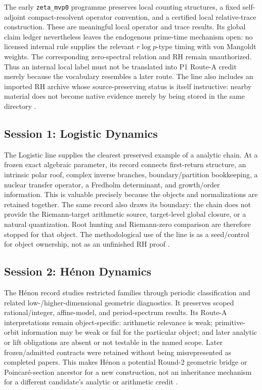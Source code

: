 The early \texttt{zeta\_mvp0} programme preserves local counting structures,
a fixed self-adjoint compact-resolvent operator convention, and a certified
local relative-trace construction. These are meaningful local operator and
trace results. Its global claim ledger nevertheless leaves the endogenous
prime-time mechanism open: no licensed internal rule supplies the relevant
\(r\log p\)-type timing with von Mangoldt weights. The corresponding
zero-spectral relation and RH remain unauthorized. Thus an internal local
label must not be translated into P1 Route-A credit merely because the
vocabulary resembles a later route. The line also includes an imported RH
archive whose source-preserving status is itself instructive: nearby material
does not become native evidence merely by being stored in the same directory
\citep{PhaseIRepository}.



\subsection{Session 1: Logistic Dynamics}

The Logistic line supplies the clearest preserved example of a \sameobject{}
analytic chain. At a frozen exact algebraic parameter, its record connects
first-return structure, an intrinsic polar roof, complex inverse branches,
boundary/partition bookkeeping, a nuclear transfer operator, a Fredholm
determinant, and growth/order information. This is valuable precisely because
the objects and normalizations are retained together. The same record also
draws its boundary: the chain does not provide the Riemann-target arithmetic
source, target-level global closure, or a natural quantization. Root hunting
and Riemann-zero comparison are therefore stopped for that object. The
methodological use of the line is as a seed/control for object ownership, not
as an unfinished RH proof \citep{PhaseIRepository}.

\subsection{Session 2: H\'{e}non Dynamics}

The H\'{e}non record studies restricted families through periodic
classification and related low-/higher-dimensional geometric diagnostics. It
preserves scoped rational/integer, affine-model, and period-spectrum results.
Its Route-A interpretations remain object-specific: arithmetic relevance is
weak; primitive-orbit information may be weak or fail for the particular
object; and later analytic or lift obligations are absent or not testable in
the named scope. Later frozen/admitted contracts were retained without being
misrepresented as completed papers. This makes H\'{e}non a potential Round-2
geometric bridge or Poincar\'{e}-section ancestor for a new construction, not an
inheritance mechanism for a different candidate's analytic or arithmetic
credit \citep{PhaseIRepository}.

